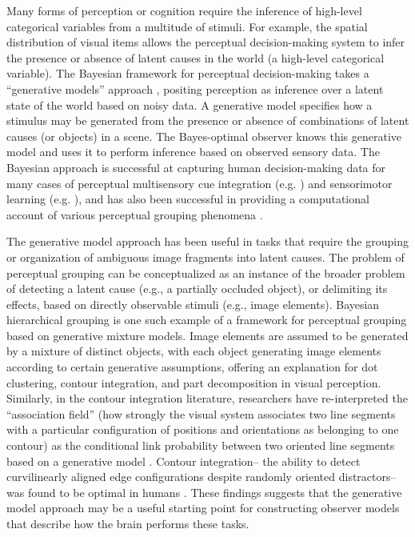 \documentclass{article}
\begin{document}
Many forms of perception or cognition require the inference of high-level categorical variables from a multitude of stimuli. For example, the spatial distribution of visual items allows the perceptual decision-making system to infer the presence or absence of latent causes in the world (a high-level categorical variable). The Bayesian framework for perceptual decision-making takes a ``generative models'' approach \cite{von1867handbuch}, positing perception as inference over a latent state of the world based on noisy data. A generative model specifies how a stimulus may be generated from the presence or absence of combinations of latent causes (or objects) in a scene. The Bayes-optimal observer  knows this generative model and uses it to perform inference based on observed sensory data. The Bayesian approach is successful at capturing human decision-making data for many cases of perceptual multisensory cue integration (e.g. \cite{ernst2002humans, kording2007causal}) and sensorimotor learning (e.g. \cite{ kording2004bayesian}), and has also been successful in providing a computational account of various perceptual grouping phenomena \cite{wagemans2012century}.

    The generative model approach has been useful in tasks that require the grouping or organization of ambiguous image fragments into latent causes. The problem of perceptual grouping can be conceptualized as an instance of the broader problem of detecting a latent cause (e.g., a partially occluded object), or delimiting its effects, based on directly observable stimuli (e.g., image elements). Bayesian hierarchical grouping \cite{froyen2015bayesian} is one such example of a framework for perceptual grouping based on generative mixture models. Image elements are assumed to be generated by a mixture of distinct objects, with each object generating image elements according to certain generative assumptions, offering an explanation for dot clustering, contour integration, and part decomposition in visual perception. Similarly, in the contour integration literature, researchers have re-interpreted the ``association field'' (how strongly the visual system associates two line segments with a particular configuration of positions and orientations as belonging to one contour) \cite{field1993contour} as the conditional link probability between two oriented line segments based on a generative model \cite{williams2001orientation}. Contour integration-- the ability to detect curvilinearly aligned edge configurations despite randomly oriented distractors-- was found to be optimal in humans \cite{ernst2012optimality}. These findings suggests that the generative model approach may be a useful starting point for constructing observer models that describe how the brain performs these tasks. 
\end{document}
